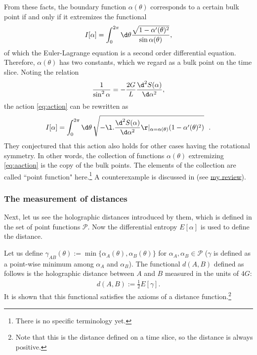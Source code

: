 \documentclass[12pt]{article}
\begin{document}
From these facts, the boundary function $\alpha(\theta)$ corresponds to a certain bulk point 
if and only if it extremizes the functional
\begin{align}
	I[\alpha] = \int_0^{2\pi}\d\theta \frac{\sqrt{1-\alpha'(\theta)^2}}{\sin\alpha(\theta)},\label{eq:action}
\end{align}
of which the Euler-Lagrange equation is a second order differential equation.
Therefore, $\alpha(\theta)$ has two constants, which we regard as a bulk point on the time slice.
Noting the relation
\begin{align}
	\frac{1}{\sin^2\alpha} = -\frac{2G}{L}\frac{\d^2S(\alpha)}{\d\alpha^2},
\end{align}
the action \eqref{eq:action} can be rewritten as 
\begin{align}
	I[\alpha] = \int_0^{2\pi}\d\theta\,\sqrt{-\l.\frac{\d^2S(\alpha)}{\d\alpha^2}\r|_{\alpha = \alpha(\theta)}(1-\alpha'(\theta)^2)}~~.\label{eq:aaction}
\end{align}
They conjectured that this action also holds for other cases having the rotational symmetry.
In other words, the collection of functions $\alpha(\theta)$ extremizing \eqref{eq:aaction} is the copy of the bulk points.
The elements of the collection are called ``point function" here.\footnote{There is no specific terminology yet.}
A counterexample is discussed in \cite{Burda:2018rpb} 
(see \href{https://albertmcc.github.io/web/reviews/holographic_bubble.pdf}{\color{blue}my review}).

\subsubsection*{The measurement of distances}

Next, let us see the holographic distances introduced by them, which is defined in the set of point functions $\mathcal P$.
Now the differential entropy $E[\alpha]$ is used to define the distance.

Let us define $\gamma_{AB}(\theta) := \min\{\alpha_A(\theta),\alpha_B(\theta)\}$ for $\alpha_A,\alpha_B\in\mathcal P$ 
($\gamma$ is defined as a point-wise minimum among $\alpha_A$ and $\alpha_B$).
The functional $d(A,B)$ defined as follows is the holographic distance between 
$A$ and $B$ measured in the units of $4G$:
\begin{align}
	d(A,B) := \frac{1}{2}E[\gamma].\label{eq:dist}
\end{align}
It is shown that this functional satisfies the axioms of a distance function.\footnote{
Note that this is the distance defined on a time slice, so the distance is always positive.}
\end{document}

